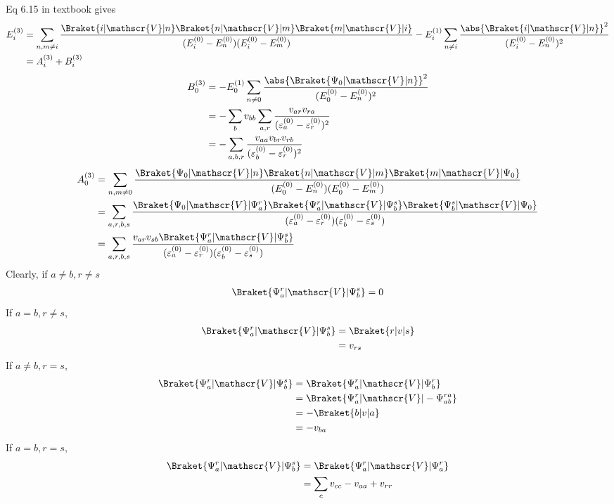 \documentclass[a4paper]{article}
\begin{document}
Eq 6.15 in textbook gives
\begin{align}
E_i^{(3)} &= \sum_{n,m\neq i} \dfrac{\Braket{i|\mathscr{V}|n} \Braket{n|\mathscr{V}|m} \Braket{m|\mathscr{V}|i}}{(E_i^{(0)}-E_n^{(0)}) (E_i^{(0)}-E_m^{(0)})} 
- E_i^{(1)}\sum_{n\neq i} \dfrac{\abs{\Braket{i|\mathscr{V}|n}}^2 }{(E_i^{(0)}-E_n^{(0)})^2} \notag\\
&= A_i^{(3)} + B_i^{(3)}
\end{align}
\begin{align}
B_0^{(3)} &= - E_0^{(1)}\sum_{n\neq 0} \dfrac{\abs{\Braket{\Psi_0|\mathscr{V}|n}}^2 }{(E_0^{(0)}-E_n^{(0)})^2} \notag\\
&= -\sum_b v_{bb} \sum_{a,r}\dfrac{v_{ar}v_{ra}}{(\varepsilon_a^{(0)} - \varepsilon_r^{(0)})^2} \notag\\
&= - \sum_{a,b,r}\dfrac{v_{aa} v_{br}v_{rb}}{(\varepsilon_b^{(0)} - \varepsilon_r^{(0)})^2} 
\end{align}
\begin{align}
A_0^{(3)} &= \sum_{n,m\neq 0} \dfrac{\Braket{\Psi_0|\mathscr{V}|n} \Braket{n|\mathscr{V}|m} \Braket{m|\mathscr{V}|\Psi_0}}{(E_0^{(0)}-E_n^{(0)}) (E_0^{(0)}-E_m^{(0)})} \notag\\
&= \sum_{a,r,b,s} \dfrac{\Braket{\Psi_0|\mathscr{V}|\Psi_a^r} \Braket{\Psi_a^r|\mathscr{V}|\Psi_b^s} \Braket{\Psi_b^s|\mathscr{V}|\Psi_0}}{(\varepsilon_a^{(0)} - \varepsilon_r^{(0)}) (\varepsilon_b^{(0)} - \varepsilon_s^{(0)})} \notag\\
&= \sum_{a,r,b,s} \dfrac{v_{ar}v_{sb} \Braket{\Psi_a^r|\mathscr{V}|\Psi_b^s} }{(\varepsilon_a^{(0)} - \varepsilon_r^{(0)}) (\varepsilon_b^{(0)} - \varepsilon_s^{(0)})} 
\end{align}
Clearly, if $ a\neq b, r\neq s $
\begin{align}
\Braket{\Psi_a^r | \mathscr{V} | \Psi_b^s} = 0
\end{align}
If $ a=b, r\neq s $,
\begin{align}
\Braket{\Psi_a^r | \mathscr{V} | \Psi_b^s} 
&= \Braket{r| v |s} \notag\\
&= v_{rs}
\end{align}
If $ a\neq b, r= s $,
\begin{align}
\Braket{\Psi_a^r | \mathscr{V} | \Psi_b^s} 
&= \Braket{\Psi_a^r | \mathscr{V} | \Psi_b^r} \notag\\
&= \Braket{\Psi_a^r | \mathscr{V} | -\Psi_{ab}^{ra}} \notag\\
&= -\Braket{b| v |a} \notag\\
&= -v_{ba}
\end{align}
If $ a= b, r= s $,
\begin{align}
\Braket{\Psi_a^r | \mathscr{V} | \Psi_b^s} 
&= \Braket{\Psi_a^r | \mathscr{V} | \Psi_a^r} \notag\\
&= \sum_c v_{cc} - v_{aa} + v_{rr}
\end{align}
\end{document}
